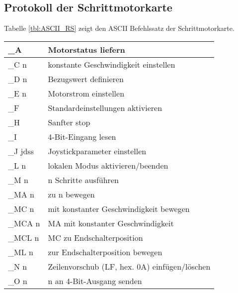 \subsection{Protokoll der Schrittmotorkarte}
Tabelle \ref{tbl:ASCII_RS} zeigt den ASCII Befehlssatz der Schrittmotorkarte.
\label{sec:A_ASCII_Befehle}
\begin{table}[htb]
\begin{tabular}{|l|l|}	\hline 
\rule[-1ex]{0pt}{2.5ex} \_A 		& Motorstatus liefern                          \\ \hline 
\rule[-1ex]{0pt}{2.5ex} \_C n		& konstante Geschwindigkeit einstellen         \\ \hline 
\rule[-1ex]{0pt}{2.5ex} \_D n 		& Bezugswert definieren                        \\ \hline 
\rule[-1ex]{0pt}{2.5ex} \_E n		& Motorstrom einstellen                        \\ \hline 
\rule[-1ex]{0pt}{2.5ex} \_F 		& Standardeinstellungen aktivieren             \\ \hline 
\rule[-1ex]{0pt}{2.5ex} \_H 		& Sanfter stop                                 \\ \hline 
\rule[-1ex]{0pt}{2.5ex} \_I 		& 4-Bit-Eingang lesen                          \\ \hline 
\rule[-1ex]{0pt}{2.5ex} \_J jdss 	& Joystickparameter einstellen                 \\ \hline 
\rule[-1ex]{0pt}{2.5ex} \_L n 		& lokalen Modus aktivieren/beenden             \\ \hline 
\rule[-1ex]{0pt}{2.5ex} \_M n 		& n Schritte ausführen                         \\ \hline 
\rule[-1ex]{0pt}{2.5ex} \_MA n 		& zu n bewegen                                 \\ \hline 
\rule[-1ex]{0pt}{2.5ex} \_MC n 		& mit konstanter Geschwindigkeit bewegen       \\ \hline 
\rule[-1ex]{0pt}{2.5ex} \_MCA n 	& MA mit konstanter Geschwindigkeit            \\ \hline 
\rule[-1ex]{0pt}{2.5ex} \_MCL n 	& MC zu Endschalterposition                    \\ \hline 
\rule[-1ex]{0pt}{2.5ex} \_ML n 		& zur Endschalterposition bewegen              \\ \hline 
\rule[-1ex]{0pt}{2.5ex} \_N n 		& Zeilenvorschub (LF, hex. 0A) einfügen/löschen\\ \hline 
\rule[-1ex]{0pt}{2.5ex} \_O n 		& n an 4-Bit-Ausgang senden                    \\ \hline 

\end{tabular}
\end{table}
